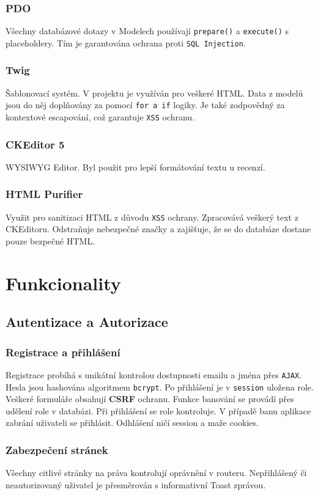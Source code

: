\documentclass[12pt, a4paper]{article}
\begin{document}
\subsubsection{PDO}
Všechny databázové dotazy v Modelech používají \verb|prepare()| a \verb|execute()| s placeholdery. 
Tím je garantována ochrana proti \verb|SQL Injection|.


\subsubsection{Twig}
Šablonovací systém. V projektu je využíván pro veškeré HTML. Data z modelů jsou do něj doplňovány za pomocí \verb|for a if| logiky.
Je také zodpovědný za kontextové escapování, což garantuje \verb|XSS| ochranu.


\subsubsection{CKEditor 5}
WYSIWYG Editor. Byl použit pro lepší formátování textu u recenzí.

\subsubsection{HTML Purifier}
Využit pro sanitizaci HTML z důvodu \verb|XSS| ochrany. Zpracovává veškerý text z CKEditoru.
Odstraňuje nebezpečné značky a zajišťuje, že se do databáze dostane pouze bezpečné HTML.

\section{Funkcionality}
\subsection{Autentizace a Autorizace}
\subsubsection{Registrace a přihlášení}
Registrace probíhá s unikátní kontrolou dostupnosti emailu a jména přes \verb|AJAX|.
Hesla jsou hashována algoritmem \verb|bcrypt|. Po přihlášení je v \verb|session| uložena role.
Veškeré formuláře obsahují \textbf{CSRF} ochranu. Funkce banování se provádí přes udělení role v databázi.
Při přihlášení se role kontroluje. V případě banu aplikace zabrání uživateli se přihlásit.
Odhlášení ničí session a maže cookies.

\subsubsection{Zabezpečení stránek}
Všechny citlivé stránky na práva kontrolují oprávnění v routeru.
Nepřihlášený či neautorizovaný uživatel je přesměrován s informativní Toast zprávou.
\end{document}
